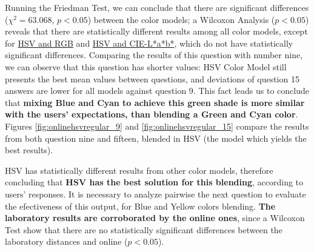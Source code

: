 %
Running the Friedman Test, we can conclude that there are significant differences ($\chi^2 = 63.068$, $p < 0.05$) between the color models; a Wilcoxon Analysis ($p < 0.05$) reveals that
there are statistically different results among all color models, except for \ul{HSV and RGB} and \ul{HSV and CIE-L*a*b*}, which do not have statistically significant differences.
Comparing the results of this question with number nine, we can observe that this question has shorter values: HSV Color Model still presents the best mean values between questions, and deviations of question 15
answers are lower for all models against question 9. This fact leads us to conclude that \textbf{mixing Blue and Cyan to achieve this green shade is more similar with the users' expectations, than blending a Green and
Cyan color}. Figures \ref{fig:onlinehsvregular_9} and \ref{fig:onlinehsvregular_15} compare the results from both question nine and fifteen, blended in HSV (the model which yields the best results). \par
%
HSV has statistically different results from other color models, therefore concluding that \textbf{HSV has the best solution for this blending}, according to users' responses. It is necessary to analyze
pairwise the next question to evaluate the efectiveness of this output, for Blue and Yellow colors blending. \textbf{The laboratory results are corroborated by the online ones}, since a Wilcoxon Test show that there
are no statistically significant differences between the laboratory distances and online ($p < 0.05$).\par
%

